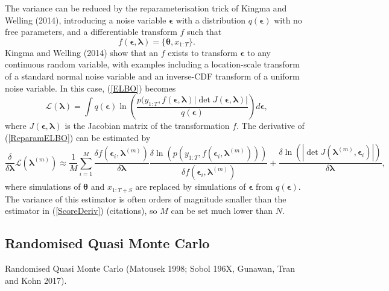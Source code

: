 \documentclass[12pt,a4paper]{article}%
\numberwithin{equation}{section}
\begin{document}
The variance can be reduced by the reparameterisation trick of Kingma and Welling (2014), introducing a noise variable $\boldsymbol{\epsilon}$ with a distribution $q(\boldsymbol{\epsilon})$ with no free parameters, and a differentiable transform $f$ such that
\begin{equation}
\label{Reparam}
f(\boldsymbol{\epsilon}, \boldsymbol{\lambda}) = \{\boldsymbol{\theta}, x_{1:T}\}.
\end{equation}
Kingma and Welling (2014) show that an $f$ exists to transform $\boldsymbol{\epsilon}$ to any continuous random variable, with examples including a location-scale transform of a standard normal noise variable and an inverse-CDF transform of a uniform noise variable. In this case, (\ref{ELBO}) becomes
\begin{equation}
\label{ReparamELBO}
\mathcal{L}(\boldsymbol{\lambda}) = \int q(\boldsymbol{\epsilon}) \ln \left( \frac{p(y_{1:T},f(\boldsymbol{\epsilon}, \boldsymbol{\lambda}) |\det J(\boldsymbol{\epsilon}, \boldsymbol{\lambda})|}{q(\boldsymbol{\epsilon})} \right) d\boldsymbol{\epsilon},
\end{equation}
where $J(\boldsymbol{\epsilon}, \boldsymbol{\lambda})$ is the Jacobian matrix of the transformation $f$. The derivative of (\ref{ReparamELBO}) can be estimated by 
\begin{equation}
\label{ReparamDeriv}
\frac{\delta}{\delta \boldsymbol{\lambda}}\mathcal{L}(\boldsymbol{\lambda}^{(m)}) \approx \frac{1}{M}\sum_{i=1}^{M}
\frac{\delta f(\boldsymbol{\epsilon}_i, \boldsymbol{\lambda}^{(m)})} {\delta \boldsymbol{\lambda}}
\frac{\delta \ln (p(y_{1:T}, f(\boldsymbol{\epsilon}_i, \boldsymbol{\lambda}^{(m)})))}{\delta f(\boldsymbol{\epsilon}_i, \boldsymbol{\lambda}^{(m)})} + \frac{\delta  \ln(|\det J(\boldsymbol{\lambda}^{(m)}, \boldsymbol{\epsilon}_i)|)}{\delta \boldsymbol{\lambda}},
\end{equation} 
where simulations of $\boldsymbol{\theta}$ and $x_{1:T+S}$ are replaced by simulations of $\boldsymbol{\epsilon}$ from $q(\boldsymbol{\epsilon})$. The variance of this estimator is often orders of magnitude smaller than the estimator in (\ref{ScoreDeriv}) (citations), so $M$ can be set much lower than $N$.

\subsection{Randomised Quasi Monte Carlo}
Randomised Quasi Monte Carlo (Matousek 1998; Sobol 196X, Gunawan, Tran and Kohn 2017).
\end{document}
